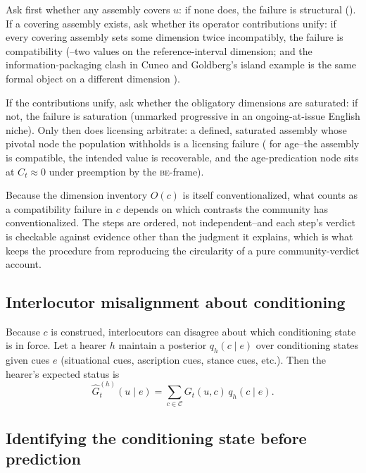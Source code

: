 Ask first whether any assembly covers $u$: if none does, the failure is structural (). If a covering assembly exists, ask whether its operator contributions unify: if every covering assembly sets some dimension twice incompatibly, the failure is compatibility (--two values on the reference-interval dimension; and the information-packaging clash in Cuneo and Goldberg's island example is the same formal object on a different dimension \autocite{CuneoGoldberg2022Islands}).

If the contributions unify, ask whether the obligatory dimensions are saturated: if not, the failure is saturation (unmarked progressive in an ongoing-at-issue English niche). Only then does licensing arbitrate: a defined, saturated assembly whose pivotal node the population withholds is a licensing failure ( for age--the assembly is compatible, the intended value is recoverable, and the age-predication node sits at $C_t\approx0$ under preemption by the \textsc{be}-frame).

Because the dimension inventory $O(c)$ is itself conventionalized, what counts as a compatibility failure in $c$ depends on which contrasts the community has conventionalized. The steps are ordered, not independent--and each step's verdict is checkable against evidence other than the judgment it explains, which is what keeps the procedure from reproducing the circularity of a pure community-verdict account.

\subsection{Interlocutor misalignment about conditioning}
\label{sec:misalignment-conditioning}

Because $c$ is construed, interlocutors can disagree about which conditioning state is in force. Let a hearer $h$ maintain a posterior $q_h(c\mid e)$ over conditioning states given cues $e$ (situational cues, ascription cues, stance cues, etc.). Then the hearer's expected status is
\begin{equation*}
\hat{G}^{(h)}_{t}(u\mid e)=\sum_{c\in\mathcal{C}} G_t(u,c)\,q_h(c\mid e).
\end{equation*}

\subsection{Identifying the conditioning state before prediction}
\label{sec:identification-c}

